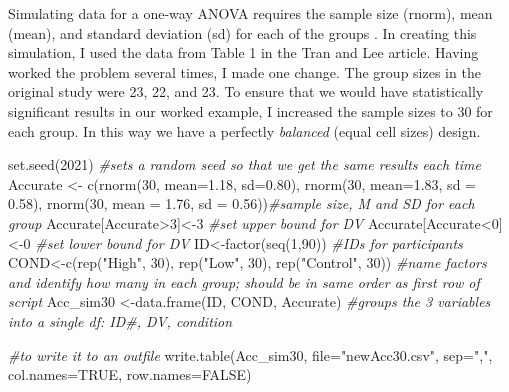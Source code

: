 \documentclass[
  english,
]{book}
\newenvironment{Shaded}{\begin{snugshade}}{\end{snugshade}}
\newcommand{\AttributeTok}[1]{\textcolor[rgb]{0.77,0.63,0.00}{#1}}
\newcommand{\CommentTok}[1]{\textcolor[rgb]{0.56,0.35,0.01}{\textit{#1}}}
\newcommand{\ConstantTok}[1]{\textcolor[rgb]{0.00,0.00,0.00}{#1}}
\newcommand{\DecValTok}[1]{\textcolor[rgb]{0.00,0.00,0.81}{#1}}
\newcommand{\FloatTok}[1]{\textcolor[rgb]{0.00,0.00,0.81}{#1}}
\newcommand{\FunctionTok}[1]{\textcolor[rgb]{0.00,0.00,0.00}{#1}}
\newcommand{\NormalTok}[1]{#1}
\newcommand{\OtherTok}[1]{\textcolor[rgb]{0.56,0.35,0.01}{#1}}
\newcommand{\SpecialCharTok}[1]{\textcolor[rgb]{0.00,0.00,0.00}{#1}}
\newcommand{\StringTok}[1]{\textcolor[rgb]{0.31,0.60,0.02}{#1}}
\begin{document}
Simulating data for a one-way ANOVA requires the sample size (rnorm), mean (mean), and standard deviation (sd) for each of the groups \citep{crump_programming_2018}. In creating this simulation, I used the data from Table 1 in the Tran and Lee \citeyearpar{tran_you_2014} article. Having worked the problem several times, I made one change. The group sizes in the original study were 23, 22, and 23. To ensure that we would have statistically significant results in our worked example, I increased the sample sizes to 30 for each group. In this way we have a perfectly \emph{balanced} (equal cell sizes) design.

\begin{Shaded}
\begin{Highlighting}[]
\FunctionTok{set.seed}\NormalTok{(}\DecValTok{2021}\NormalTok{) }\CommentTok{\#sets a random seed so that we get the same results each time}
\NormalTok{Accurate }\OtherTok{\textless{}{-}} \FunctionTok{c}\NormalTok{(}\FunctionTok{rnorm}\NormalTok{(}\DecValTok{30}\NormalTok{, }\AttributeTok{mean=}\FloatTok{1.18}\NormalTok{, }\AttributeTok{sd=}\FloatTok{0.80}\NormalTok{), }\FunctionTok{rnorm}\NormalTok{(}\DecValTok{30}\NormalTok{, }\AttributeTok{mean=}\FloatTok{1.83}\NormalTok{, }\AttributeTok{sd =} \FloatTok{0.58}\NormalTok{), }\FunctionTok{rnorm}\NormalTok{(}\DecValTok{30}\NormalTok{, }\AttributeTok{mean =} \FloatTok{1.76}\NormalTok{, }\AttributeTok{sd =} \FloatTok{0.56}\NormalTok{))}\CommentTok{\#sample size, M and SD for each group}
\NormalTok{Accurate[Accurate}\SpecialCharTok{\textgreater{}}\DecValTok{3}\NormalTok{]}\OtherTok{\textless{}{-}}\DecValTok{3} \CommentTok{\#set upper bound for DV}
\NormalTok{Accurate[Accurate}\SpecialCharTok{\textless{}}\DecValTok{0}\NormalTok{]}\OtherTok{\textless{}{-}}\DecValTok{0} \CommentTok{\#set lower bound for DV}
\NormalTok{ID}\OtherTok{\textless{}{-}}\FunctionTok{factor}\NormalTok{(}\FunctionTok{seq}\NormalTok{(}\DecValTok{1}\NormalTok{,}\DecValTok{90}\NormalTok{)) }\CommentTok{\#IDs for participants}
\NormalTok{COND}\OtherTok{\textless{}{-}}\FunctionTok{c}\NormalTok{(}\FunctionTok{rep}\NormalTok{(}\StringTok{"High"}\NormalTok{, }\DecValTok{30}\NormalTok{), }\FunctionTok{rep}\NormalTok{(}\StringTok{"Low"}\NormalTok{, }\DecValTok{30}\NormalTok{), }\FunctionTok{rep}\NormalTok{(}\StringTok{"Control"}\NormalTok{, }\DecValTok{30}\NormalTok{)) }\CommentTok{\#name factors and identify how many in each group; should be in same order as first row of script}
\NormalTok{Acc\_sim30 }\OtherTok{\textless{}{-}}\FunctionTok{data.frame}\NormalTok{(ID, COND, Accurate) }\CommentTok{\#groups the 3 variables into a single df:  ID\#, DV, condition}

\CommentTok{\#to write it to an outfile}
\FunctionTok{write.table}\NormalTok{(Acc\_sim30, }\AttributeTok{file=}\StringTok{"newAcc30.csv"}\NormalTok{, }\AttributeTok{sep=}\StringTok{","}\NormalTok{, }\AttributeTok{col.names=}\ConstantTok{TRUE}\NormalTok{, }\AttributeTok{row.names=}\ConstantTok{FALSE}\NormalTok{)}
\end{Highlighting}
\end{Shaded}
\end{document}
